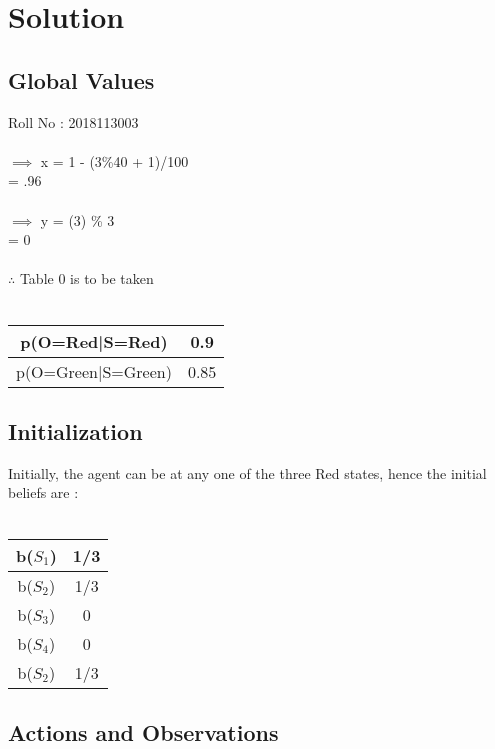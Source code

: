 \documentclass[10pt,letterpaper]{article}
\begin{document}
\section*{Solution}
\subsection*{Global Values}
Roll No : 2018113003\\\\
$\implies$ x = 1 - (3\%40 + 1)/100\\
        \hspace*{28pt}    = .96
\\\\
$\implies$ y = (3) \% 3\\
\hspace*{28pt} = 0\\\\ 
$\therefore$ Table 0 is to be taken\\\\
\begin{tabular}{|c|c|}
    \hline
    p(O=Red|S=Red) & 0.9\\
    \hline
    p(O=Green|S=Green) & 0.85\\
    \hline
\end{tabular}

\subsection*{Initialization}
Initially, the agent can be at any one of the three Red states, hence the initial 
beliefs are :\\\\
\begin{tabular}{|c|c|}
    \hline
    b($S_1$) & 1/3\\
    \hline
    b($S_2$) & 1/3\\
    \hline
    b($S_3$) & 0\\
    \hline
    b($S_4$) & 0\\
    \hline
    b($S_2$) & 1/3\\
    \hline
\end{tabular}

\subsection*{Actions and Observations}
\end{document}

